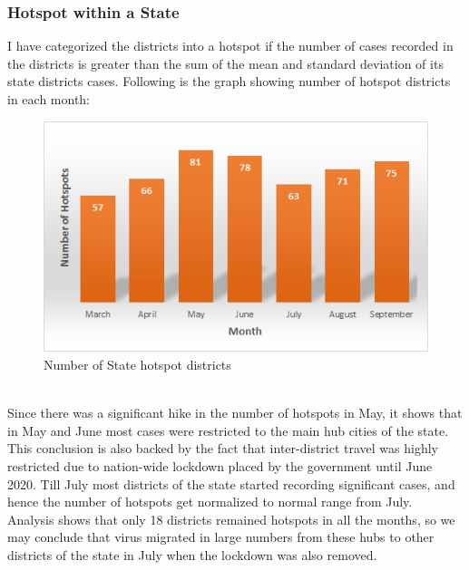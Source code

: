\documentclass{article}
\begin{document}
\subsubsection{Hotspot within a State}
I have categorized the districts into a hotspot if the number of cases recorded in the districts is greater than the sum of the mean and standard deviation of its state districts cases. Following is the graph showing number of hotspot districts in each month:
\begin{figure}[h]
    \centering
    \includegraphics{images/state-month-hotspots.png}
    \caption{Number of State hotspot districts}
\end{figure}
\\
Since there was a significant hike in the number of hotspots in May, it shows that in May and June most cases were restricted to the main hub cities of the state. This conclusion is also backed by the fact that inter-district travel was highly restricted due to nation-wide lockdown placed by the government until June 2020. Till July most districts of the state started recording significant cases, and hence the number of hotspots get normalized to normal range from July. \\
Analysis shows that only 18 districts remained hotspots in all the months, so we may conclude that virus migrated in large numbers from these hubs to other districts of the state in July when the lockdown was also removed.
\end{document}
